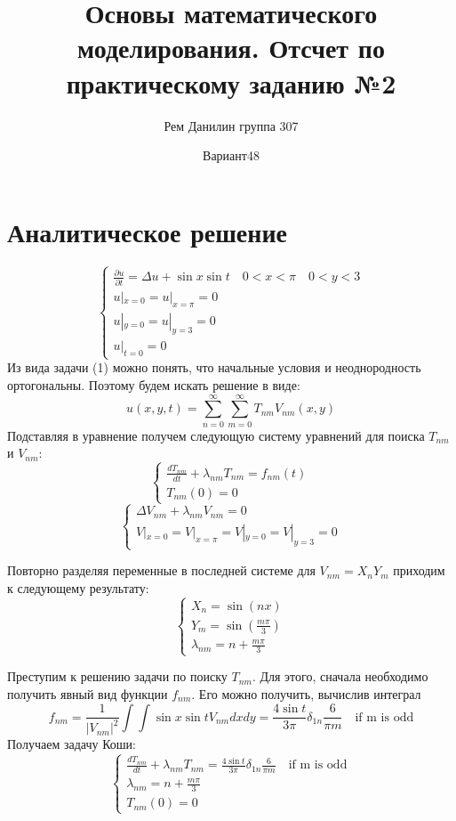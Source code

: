 \documentclass{article}
\title{Основы математического моделирования. Отсчет по практическому заданию №2}
\author{Рем Данилин группа 307}
\date{Вариант48}
\begin{document}
\maketitle
\section{Аналитическое решение}
\begin{equation}
    \begin{cases}
        \frac{\partial u }{\partial t} = \Delta u + \sin x \sin t \quad 0<x<\pi\quad 0<y<3\\
        u|_{x = 0} = u|_{x = \pi} = 0\\
        u|_{y = 0} = u|_{y = 3} = 0\\
        u|_{t = 0} = 0
    \end{cases}
\end{equation}
Из вида задачи (1) можно понять, что начальные условия и
неоднородность ортогональны. Поэтому будем искать решение в виде:
$$
u(x,y,t) = \sum\limits_{n=0}^{\infty}\sum\limits_{m=0}^{\infty} T_{nm} V_{nm}(x,y)
$$
Подставляя в уравнение получем следующую систему уравнений для поиска $T_{nm}$ и $V_{nm}$:
$$
\begin{cases}
\frac{d T_{nm}}{dt} + \lambda_{nm} T_{nm} = f_{nm}(t)\\
T_{nm} (0) = 0
\end{cases}
$$
$$
\begin{cases}
\Delta V_{nm} + \lambda_{nm} V_{nm} = 0\\
V|_{x=0} = V|_{x=\pi} = V|_{y=0} =V|_{y=3} = 0
\end{cases}
$$

Повторно разделяя переменные в последней системе для $V_{nm} = X_n Y_m$ приходим к следующему результату:
$$
\begin{cases}
X_{n} = \sin (nx) \\
Y_m = \sin (\frac{m\pi}{3})\\
\lambda_{nm} = n + \frac{m\pi}{3}
\end{cases}
$$

Преступим к решению задачи по поиску $T_{nm}$. Для этого, сначала необходимо получить явный вид функции $f_{nm}$. Его можно получить, вычислив интеграл
$$
f_{nm} = \frac{1}{|V_{nm}|^2} \int\int \sin x \sin t V_{nm} dx dy = \frac{4 \sin t}{3\pi} \delta_{1n}\frac{6}{\pi m}\quad \text{if m is odd}
$$
Получаем задачу Коши:
$$
\begin{cases}

\frac{d T_{nm}}{dt} +  \lambda_{nm}T_{nm} = 
\frac{4\sin t}{3\pi} \delta_{1n} \frac{6}{\pi m}\quad \text{if m is odd}\\
\lambda_{nm} = n + \frac{m\pi}{3}\\
T_{nm}(0) = 0
\end{cases}
$$
\end{document}
